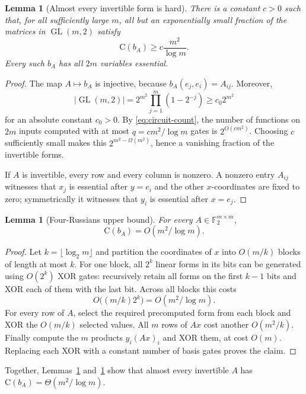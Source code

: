 \documentclass[11pt]{article}
\newtheorem{lemma}[theorem]{Lemma}
\theoremstyle{definition}
\newcommand{\F}{\mathbb F}
\newcommand{\C}{\mathrm{C}}
\newcommand{\GL}{\operatorname{GL}}
\begin{document}
\begin{lemma}[Almost every invertible form is hard]
\label{lem:bilinear-hard}
There is a constant $c>0$ such that, for all sufficiently large $m$, all but
an exponentially small fraction of the matrices in $\GL(m,2)$ satisfy
\[
  \C(b_A)\ge c\frac{m^2}{\log m}.
\]
Every such $b_A$ has all $2m$ variables essential.
\end{lemma}

\begin{proof}
The map $A\mapsto b_A$ is injective, because
$b_A(e_j,e_i)=A_{ij}$.  Moreover,
\[
 |\GL(m,2)|
   =2^{m^2}\prod_{j=1}^m(1-2^{-j})
   \ge c_0 2^{m^2}
\]
for an absolute constant $c_0>0$.  By \eqref{eq:circuit-count}, the number of
functions on $2m$ inputs computed with at most
$q=c m^2/\log m$ gates is $2^{O(c m^2)}$.  Choosing $c$ sufficiently small
makes this $2^{m^2-\Omega(m^2)}$, hence a vanishing fraction of the invertible
forms.

If $A$ is invertible, every row and every column is nonzero.  A nonzero entry
$A_{ij}$ witnesses that $x_j$ is essential after $y=e_i$ and the other
$x$-coordinates are fixed to zero; symmetrically it witnesses that $y_i$ is
essential after $x=e_j$.
\end{proof}

\begin{lemma}[Four-Russians upper bound]
\label{lem:bilinear-upper}
For every $A\in\F_2^{m\times m}$,
\[
  \C(b_A)=O(m^2/\log m).
\]
\end{lemma}

\begin{proof}
Let $k=\lfloor\log_2m\rfloor$ and partition the coordinates of $x$ into
$O(m/k)$ blocks of length at most $k$.  For one block, all $2^k$ linear forms
in its bits can be generated using $O(2^k)$ XOR gates: recursively retain all
forms on the first $k-1$ bits and XOR each of them with the last bit.  Across
all blocks this costs
\[
  O\bigl((m/k)2^k\bigr)=O(m^2/\log m).
\]
For every row of $A$, select the required precomputed form from each block and
XOR the $O(m/k)$ selected values.  All $m$ rows of $Ax$ cost another
$O(m^2/k)$.  Finally compute the $m$ products $y_i(Ax)_i$ and XOR them, at
cost $O(m)$.  Replacing each XOR with a constant number of basis gates proves
the claim.
\end{proof}

Together, Lemmas~\ref{lem:bilinear-hard} and~\ref{lem:bilinear-upper} show
that almost every invertible $A$ has
$\C(b_A)=\Theta(m^2/\log m)$.
\end{document}
